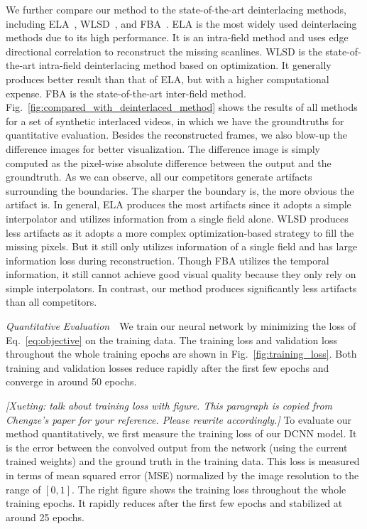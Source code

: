 \documentclass[acmtog]{acmart}
\begin{document}
We further compare our method to the state-of-the-art deinterlacing methods,
including ELA~\cite{doyle1990interlaced}, WLSD~\cite{wang2014interlacing}, and
FBA~\cite{vedadi2013interlacing}. ELA is the most widely used deinterlacing
methods due to its high performance. It is an intra-field method and uses edge
directional correlation to reconstruct the missing scanlines. WLSD is the state-of-the-art intra-field deinterlacing method based on optimization. It generally
produces better result than that of ELA, but with a higher computational
expense. FBA is the state-of-the-art inter-field method.
Fig.~\ref{fig:compared_with_deinterlaced_method} shows the results of all
methods for a set of synthetic interlaced videos, in which we have the
groundtruths for quantitative evaluation. Besides the reconstructed frames, we
also blow-up the difference images for better visualization. The difference
image is simply computed as the pixel-wise absolute difference between the
output and the groundtruth. As we can observe, all our competitors
generate artifacts surrounding the boundaries. The sharper the boundary is, the more
obvious the artifact is. In general, ELA produces the most artifacts since it
adopts a simple interpolator and utilizes information from a single field alone. 
WLSD produces less artifacts as it adopts a more complex optimization-based strategy to fill the missing pixels. But it still
only utilizes information of a single field and has large information loss
during reconstruction. Though FBA utilizes the temporal information, 
it still cannot achieve good visual quality because
they only rely on simple interpolators. In contrast, our method produces
significantly less artifacts than all competitors.



\vspace{0.15in}
\noindent\emph{Quantitative Evaluation}\,\,\,\,
We train our neural network by minimizing the loss of Eq.~\ref{eq:objective} on
the training data. The training loss and validation loss throughout the whole
training epochs are shown in Fig.~\ref{fig:training_loss}. Both training and
validation losses reduce rapidly after the first few epochs and converge in
around 50 epochs.

{\color{red} {\em [Xueting: talk about training loss with figure. This paragraph is copied from Chengze's paper for your reference. Please rewrite accordingly.]} To evaluate our method quantitatively, we first measure the training
loss of our DCNN model. It is the error between the convolved output from the network
(using the current trained weights) and the ground truth in the training data.
This loss is measured in terms of mean squared error (MSE)
normalized by the image resolution to the range of $[0, 1]$.
The right figure shows the training loss throughout the whole training epochs.
It rapidly reduces after the first few epochs and stabilized at around 25 epochs.}
\fi
\end{document}
